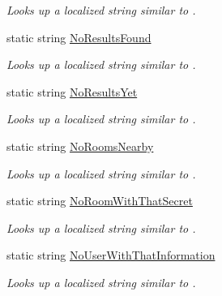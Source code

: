 \begin{DoxyCompactItemize}
\begin{DoxyCompactList}\small\item\em Looks up a localized string similar to . \end{DoxyCompactList}\item 
static string \hyperlink{class_wis_r_1_1_app___resources_1_1_resource_a8d6fd033400c0ff398ec2eead83ead0e}{No\+Results\+Found}
\begin{DoxyCompactList}\small\item\em Looks up a localized string similar to . \end{DoxyCompactList}\item 
static string \hyperlink{class_wis_r_1_1_app___resources_1_1_resource_aeb8d65628198a2b671b38aaeba43c663}{No\+Results\+Yet}
\begin{DoxyCompactList}\small\item\em Looks up a localized string similar to . \end{DoxyCompactList}\item 
static string \hyperlink{class_wis_r_1_1_app___resources_1_1_resource_a17876fe8eb196cf345f032383697ee4f}{No\+Rooms\+Nearby}
\begin{DoxyCompactList}\small\item\em Looks up a localized string similar to . \end{DoxyCompactList}\item 
static string \hyperlink{class_wis_r_1_1_app___resources_1_1_resource_a320ccc68ff397f0d7b1fcdf384caa326}{No\+Room\+With\+That\+Secret}
\begin{DoxyCompactList}\small\item\em Looks up a localized string similar to . \end{DoxyCompactList}\item 
static string \hyperlink{class_wis_r_1_1_app___resources_1_1_resource_aaddc98255fdccbbfebdb6d1777f5084d}{No\+User\+With\+That\+Information}
\begin{DoxyCompactList}\small\item\em Looks up a localized string similar to . \end{DoxyCompactList}\item 

\end{DoxyCompactItemize}
